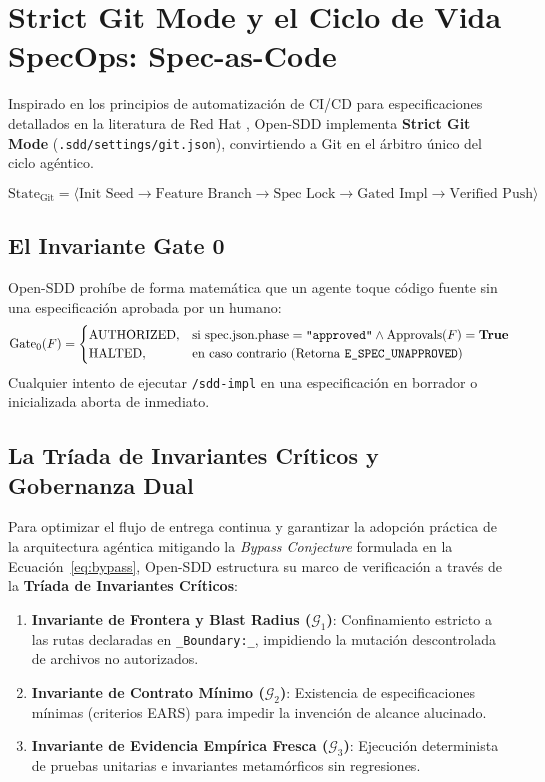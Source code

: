 \documentclass[11pt,a4paper]{article}
\begin{document}
\section{Strict Git Mode y el Ciclo de Vida SpecOps: Spec-as-Code}

Inspirado en los principios de automatización de CI/CD para especificaciones detallados en la literatura de Red Hat \cite{griffin2026spec}, Open-SDD implementa \textbf{Strict Git Mode} (\texttt{.sdd/\allowbreak settings/\allowbreak git.json}), convirtiendo a Git en el árbitro único del ciclo agéntico.

\begin{equation}
    \text{State}_{\text{Git}} = \langle \text{Init Seed} \longrightarrow \text{Feature Branch} \longrightarrow \text{Spec Lock} \longrightarrow \text{Gated Impl} \longrightarrow \text{Verified Push} \rangle
\end{equation}

\subsection{El Invariante Gate 0}
Open-SDD prohíbe de forma matemática que un agente toque código fuente sin una especificación aprobada por un humano:
\begin{equation}
    \text{Gate}_0(F) = 
    \begin{cases} 
        \text{AUTHORIZED}, & \text{si } \text{spec.json}.\text{phase} = \texttt{"approved"} \land \text{Approvals}(F) = \mathbf{True} \\
        \text{HALTED}, & \text{en caso contrario (Retorna \texttt{E\_SPEC\_UNAPPROVED})}
    \end{cases}
\end{equation}
Cualquier intento de ejecutar \texttt{/sdd-impl} en una especificación en borrador o inicializada aborta de inmediato.

\subsection{La Tríada de Invariantes Críticos y Gobernanza Dual}
Para optimizar el flujo de entrega continua y garantizar la adopción práctica de la arquitectura agéntica mitigando la \textit{Bypass Conjecture} formulada en la Ecuación~\ref{eq:bypass}, Open-SDD estructura su marco de verificación a través de la \textbf{Tríada de Invariantes Críticos}:
\begin{enumerate}
    \item \textbf{Invariante de Frontera y Blast Radius ($\mathcal{G}_1$)}: Confinamiento estricto a las rutas declaradas en \texttt{\_Boundary:\_}, impidiendo la mutación descontrolada de archivos no autorizados.
    \item \textbf{Invariante de Contrato Mínimo ($\mathcal{G}_2$)}: Existencia de especificaciones mínimas (criterios EARS) para impedir la invención de alcance alucinado.
    \item \textbf{Invariante de Evidencia Empírica Fresca ($\mathcal{G}_3$)}: Ejecución determinista de pruebas unitarias e invariantes metamórficos sin regresiones.
\end{enumerate}
\end{document}
